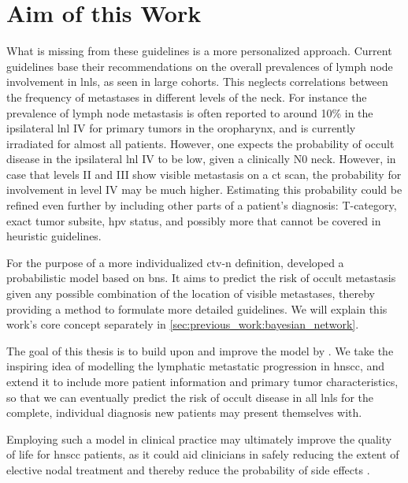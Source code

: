 \documentclass[\relativeRoot/main.tex]{subfiles}
\begin{document}
\section{Aim of this Work}
\label{sec:intro:aim}

What is missing from these guidelines is a more personalized approach. Current guidelines base their recommendations on the overall prevalences of lymph node involvement in \glspl{lnl}, as seen in large cohorts. This neglects correlations between the frequency of metastases in different levels of the neck. For instance the prevalence of lymph node metastasis is often reported to around 10\% in the ipsilateral \gls{lnl} IV for primary tumors in the oropharynx, and is currently irradiated for almost all patients. However, one expects the probability of occult disease in the ipsilateral \gls{lnl} IV to be low, given a clinically N0 neck. However, in case that levels II and III show visible metastasis on a \gls{ct} scan, the probability for involvement in level IV may be much higher. Estimating this probability could be refined even further by including other parts of a patient's diagnosis: T-category, exact tumor subsite, \gls{hpv} status, and possibly more that cannot be covered in heuristic guidelines.

For the purpose of a more individualized \gls{ctv-n} definition,  developed a probabilistic model based on \glspl{bn}. It aims to predict the risk of occult metastasis given any possible combination of the location of visible metastases, thereby providing a method to formulate more detailed guidelines. We will explain this work's core concept separately in \cref{sec:previous_work:bayesian_network}.

The goal of this thesis is to build upon and improve the model by . We take the inspiring idea of modelling the lymphatic metastatic progression in \gls{hnscc}, and extend it to include more patient information and primary tumor characteristics, so that we can eventually predict the risk of occult disease in all \glspl{lnl} for the complete, individual diagnosis new patients may present themselves with.

Employing such a model in clinical practice may ultimately improve the quality of life for \gls{hnscc} patients, as it could aid clinicians in safely reducing the extent of elective nodal treatment and thereby reduce the probability of side effects \cite{batth_practical_2014}.
\end{document}
